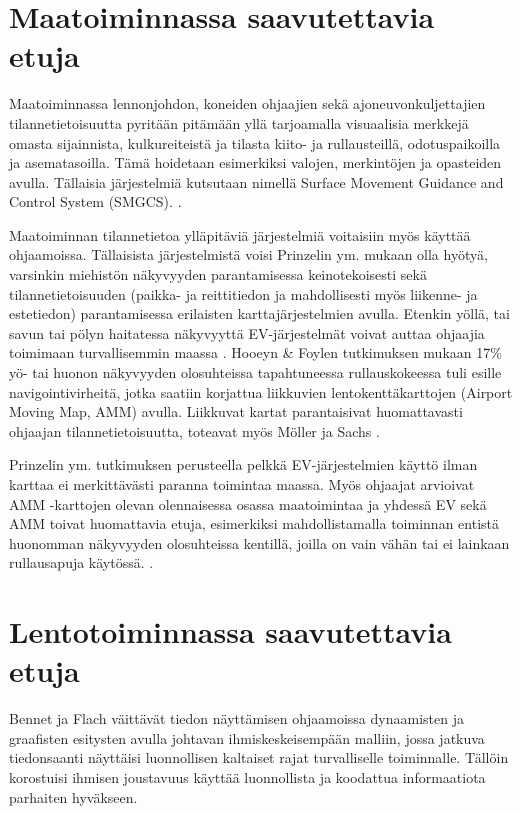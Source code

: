 \documentclass[utf8,bachelor,manualbib]{gradu3}
\begin{document}
\section{Maatoiminnassa saavutettavia etuja}

Maatoiminnassa lennonjohdon, koneiden ohjaajien sekä ajoneuvonkuljettajien tilannetietoisuutta pyritään pitämään yllä tarjoamalla visuaalisia merkkejä omasta sijainnista, kulkureiteistä ja tilasta kiito- ja rullausteillä, odotuspaikoilla ja asematasoilla. Tämä hoidetaan esimerkiksi valojen, merkintöjen ja opasteiden avulla. Tällaisia järjestelmiä kutsutaan nimellä Surface Movement Guidance and Control System (SMGCS). \citep{prinzel2013}.

Maatoiminnan tilannetietoa ylläpitäviä järjestelmiä voitaisiin myös käyttää ohjaamoissa. Tällaisista järjestelmistä voisi Prinzelin ym. \citeyearpar{prinzel2013} mukaan olla hyötyä, varsinkin miehistön näkyvyyden parantamisessa keinotekoisesti sekä tilannetietoisuuden (paikka- ja reittitiedon ja mahdollisesti myös liikenne- ja estetiedon) parantamisessa erilaisten karttajärjestelmien avulla. Etenkin yöllä, tai savun tai pölyn haitatessa näkyvyyttä EV-järjestelmät voivat auttaa ohjaajia toimimaan turvallisemmin maassa \citep{prinzel2013}. Hooeyn \& Foylen \citeyearpar{hooey2007} tutkimuksen mukaan 17\% yö- tai huonon näkyvyyden olosuhteissa tapahtuneessa rullauskokeessa tuli esille navigointivirheitä, jotka saatiin korjattua liikkuvien lentokenttäkarttojen (Airport Moving Map, AMM) avulla. Liikkuvat kartat parantaisivat huomattavasti ohjaajan tilannetietoisuutta, toteavat myös Möller ja Sachs \citeyearpar{mollersachs1994}.

Prinzelin ym. \citeyearpar{prinzel2013} tutkimuksen perusteella pelkkä EV-järjestelmien käyttö ilman karttaa ei merkittävästi paranna toimintaa maassa. Myös ohjaajat arvioivat AMM -karttojen olevan olennaisessa osassa maatoimintaa ja yhdessä EV sekä AMM toivat huomattavia etuja, esimerkiksi mahdollistamalla toiminnan entistä huonomman näkyvyyden olosuhteissa kentillä, joilla on vain vähän tai ei lainkaan rullausapuja käytössä. \citep{prinzel2013}.

\section{Lentotoiminnassa saavutettavia etuja}

Bennet ja Flach \citeyearpar{bennetflach1994} väittävät tiedon näyttämisen ohjaamoissa dynaamisten ja graafisten esitysten avulla johtavan ihmiskeskeisempään malliin, jossa jatkuva tiedonsaanti näyttäisi luonnollisen kaltaiset rajat turvalliselle toiminnalle. Tällöin korostuisi ihmisen joustavuus käyttää luonnollista ja koodattua informaatiota parhaiten hyväkseen.
\end{document}
